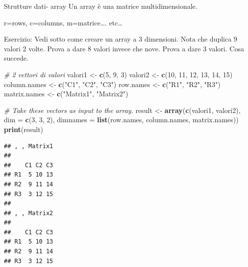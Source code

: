\documentclass[
  ignorenonframetext,
]{beamer}
\newenvironment{Shaded}{\begin{snugshade}}{\end{snugshade}}
\newcommand{\AttributeTok}[1]{\textcolor[rgb]{0.13,0.29,0.53}{#1}}
\newcommand{\CommentTok}[1]{\textcolor[rgb]{0.56,0.35,0.01}{\textit{#1}}}
\newcommand{\DecValTok}[1]{\textcolor[rgb]{0.00,0.00,0.81}{#1}}
\newcommand{\FunctionTok}[1]{\textcolor[rgb]{0.13,0.29,0.53}{\textbf{#1}}}
\newcommand{\NormalTok}[1]{#1}
\newcommand{\OtherTok}[1]{\textcolor[rgb]{0.56,0.35,0.01}{#1}}
\newcommand{\StringTok}[1]{\textcolor[rgb]{0.31,0.60,0.02}{#1}}
\begin{document}
\begin{frame}[fragile]{Strutture dati- array}
\protect\hypertarget{strutture-dati--array}{}
Un array è una matrice multidimensionale.

r=rows, c=columns, m=matrice\ldots. etc\ldots{}

\begin{block}{Esercizio:}
\protect\hypertarget{esercizio-3}{}
Vedi sotto come creare un array a 3 dimensioni. Nota che duplica 9
valori 2 volte. Prova a dare 8 valori invece che nove. Prova a dare 3
valori. Cosa succede.

\begin{Shaded}
\begin{Highlighting}[]
\CommentTok{\# 2 vettori di valori }
\NormalTok{valori1 }\OtherTok{\textless{}{-}} \FunctionTok{c}\NormalTok{(}\DecValTok{5}\NormalTok{, }\DecValTok{9}\NormalTok{, }\DecValTok{3}\NormalTok{) }
\NormalTok{valori2 }\OtherTok{\textless{}{-}} \FunctionTok{c}\NormalTok{(}\DecValTok{10}\NormalTok{, }\DecValTok{11}\NormalTok{, }\DecValTok{12}\NormalTok{, }\DecValTok{13}\NormalTok{, }\DecValTok{14}\NormalTok{, }\DecValTok{15}\NormalTok{) }
\NormalTok{column.names }\OtherTok{\textless{}{-}} \FunctionTok{c}\NormalTok{(}\StringTok{"C1"}\NormalTok{, }\StringTok{"C2"}\NormalTok{, }\StringTok{"C3"}\NormalTok{) }
\NormalTok{row.names }\OtherTok{\textless{}{-}} \FunctionTok{c}\NormalTok{(}\StringTok{"R1"}\NormalTok{, }\StringTok{"R2"}\NormalTok{, }\StringTok{"R3"}\NormalTok{) }
\NormalTok{matrix.names }\OtherTok{\textless{}{-}} \FunctionTok{c}\NormalTok{(}\StringTok{"Matrix1"}\NormalTok{, }\StringTok{"Matrix2"}\NormalTok{) }
  
\CommentTok{\# Take these vectors as input to the array. }
\NormalTok{result }\OtherTok{\textless{}{-}} \FunctionTok{array}\NormalTok{(}\FunctionTok{c}\NormalTok{(valori1, valori2), }\AttributeTok{dim =} \FunctionTok{c}\NormalTok{(}\DecValTok{3}\NormalTok{, }\DecValTok{3}\NormalTok{, }\DecValTok{2}\NormalTok{), }
                  \AttributeTok{dimnames =} \FunctionTok{list}\NormalTok{(row.names, }
\NormalTok{                                  column.names, }
\NormalTok{                                  matrix.names)) }
\FunctionTok{print}\NormalTok{(result) }
\end{Highlighting}
\end{Shaded}

\begin{verbatim}
## , , Matrix1
## 
##    C1 C2 C3
## R1  5 10 13
## R2  9 11 14
## R3  3 12 15
## 
## , , Matrix2
## 
##    C1 C2 C3
## R1  5 10 13
## R2  9 11 14
## R3  3 12 15
\end{verbatim}
\end{block}
\end{frame}
\end{document}
